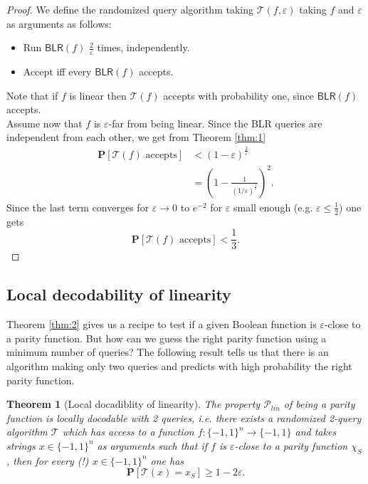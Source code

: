 \documentclass[a4paper]{article}
\newcommand{\prob}{\mathbf{P}}
\newcommand{\eps}{\varepsilon}
\theoremstyle{plain}
\newtheorem{theorem}{Theorem}
\theoremstyle{definition}
\theoremstyle{remark}
\begin{document}
\begin{proof}
  We define the randomized query algorithm taking
  \(\mathcal{T}(f,\eps)\) taking \(f\) and \(\eps\) as arguments as
  follows: 
  \begin{itemize}
  \item Run \(\textsf{BLR}(f)\) \(\frac{2}{\eps}\) times,
    independently.
  \item Accept iff every \(\textsf{BLR}(f)\) accepts. 
  \end{itemize}
  Note that if \(f\) is linear then \(\mathcal{T}(f)\) accepts with
  probability one, since \(\textsf{BLR}(f)\) accepts.\\
  Assume now that \(f\) is \(\eps\)-far from being linear. Since the
  \textsf{BLR} queries are independent from each other, we get from
  Theorem \ref{thm:1}
  \begin{align}
    \prob\left[\mathcal{T}(f) \text{ accepts}\right] 
    &< \left(1-\eps\right)^{\frac{2}{\eps}} \\
    &= \left(1-\frac{1}{(1/\eps)^{\frac{1}{\eps}}}\right)^2.
  \end{align}
  Since the last term converges for \(\eps \rightarrow 0\) to
  \(e^{-2}\) for \(\eps\) small enough (e.g. \(\eps \leq
  \frac{1}{2}\)) one gets
  \[\prob\left[\mathcal{T}(f) \text{ accepts}\right] < \frac{1}{3}.\]
\end{proof}


\subsection{Local decodability of linearity}
\label{sec:local-decod-line}

Theorem \ref{thm:2} gives us a recipe to test if a given Boolean
function is \(\eps\)-close to a parity function. But how can we guess
the right parity function using a minimum number of queries? The
following result tells us that there is an algorithm making only two
queries and predicts with high probability the right parity function. 

\begin{theorem}[Local docadiblity of linearity] \label{thm:3}
  The property \(\mathcal{P}_{lin}\) of being a parity function is
  \emph{locally docodable} with 2 queries, i.e. there exists a
  randomized 2-query algorithm \(\mathcal{T}\) which has access to a
  function \(f:\{-1,1\}^n \rightarrow \{-1,1\}\) and takes strings \(x \in
  \{-1,1\}^n\) as arguments such that if \(f\) is \(\eps\)-close to a
  parity function \(\chi_S\), then for every (!) \(x \in \{-1,1\}^n\)
  one has 
  \begin{equation}
    \label{eq:5}
    \prob\left[\mathcal{T}(x) = x_S\right] \geq 1 - 2\eps. 
  \end{equation}
\end{theorem}
\end{document}
